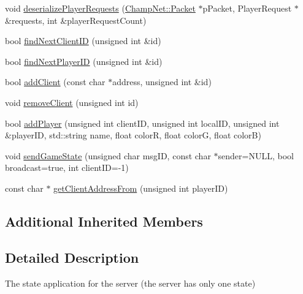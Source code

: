 \begin{DoxyCompactItemize}
void \hyperlink{class_state_server_a1d5bf4d1f14be55beab88feb0a8b5336}{deserialize\-Player\-Requests} (\hyperlink{class_champ_net_1_1_packet}{Champ\-Net\-::\-Packet} $\ast$p\-Packet, Player\-Request $\ast$\&requests, int \&player\-Request\-Count)
\item 
bool \hyperlink{class_state_server_afcde4aa297197e9f2840d24612501b5a}{find\-Next\-Client\-I\-D} (unsigned int \&id)
\item 
bool \hyperlink{class_state_server_a23120a56bdaa4d5e9d555b05e6ba1e8e}{find\-Next\-Player\-I\-D} (unsigned int \&id)
\item 
bool \hyperlink{class_state_server_a4f6675bef8d34e3e3ffbe3e71e16732e}{add\-Client} (const char $\ast$address, unsigned int \&id)
\item 
void \hyperlink{class_state_server_aa1feeeb495d9bf60f5750323e839c02d}{remove\-Client} (unsigned int id)
\item 
bool \hyperlink{class_state_server_a204e3b252a6b6f50015b598e9beb1b09}{add\-Player} (unsigned int client\-I\-D, unsigned int local\-I\-D, unsigned int \&player\-I\-D, std\-::string name, float color\-R, float color\-G, float color\-B)
\item 
void \hyperlink{class_state_server_a7d80660aa2ef7ab52ce8c86752abf145}{send\-Game\-State} (unsigned char msg\-I\-D, const char $\ast$sender=N\-U\-L\-L, bool broadcast=true, int client\-I\-D=-\/1)
\item 
const char $\ast$ \hyperlink{class_state_server_a38e2d8121f6df0cde34f459cee2f6617}{get\-Client\-Address\-From} (unsigned int player\-I\-D)
\end{DoxyCompactItemize}
\subsection*{Additional Inherited Members}


\subsection{Detailed Description}
The state application for the server (the server has only one state) 

